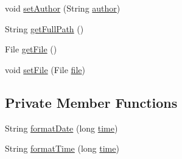\begin{DoxyCompactItemize}
\item 
void \hyperlink{classorg_1_1buildmlearn_1_1toolkit_1_1model_1_1SavedProject_a59a14f4cc86c7079a84c591177418e61}{set\+Author} (String \hyperlink{classorg_1_1buildmlearn_1_1toolkit_1_1model_1_1SavedProject_a906f1314db905654413dcbd90f25658b}{author})
\item 
String \hyperlink{classorg_1_1buildmlearn_1_1toolkit_1_1model_1_1SavedProject_af5b8dd7b1537d22874905c305fa3698a}{get\+Full\+Path} ()
\item 
File \hyperlink{classorg_1_1buildmlearn_1_1toolkit_1_1model_1_1SavedProject_abb1361575d53240244c368ab3b18ffb8}{get\+File} ()
\item 
void \hyperlink{classorg_1_1buildmlearn_1_1toolkit_1_1model_1_1SavedProject_a38b605c92572817f27a18173277c253d}{set\+File} (File \hyperlink{classorg_1_1buildmlearn_1_1toolkit_1_1model_1_1SavedProject_aecf6d31347ba21b07d34025fb55259c1}{file})
\end{DoxyCompactItemize}
\subsection*{Private Member Functions}
\begin{DoxyCompactItemize}
\item 
String \hyperlink{classorg_1_1buildmlearn_1_1toolkit_1_1model_1_1SavedProject_af17ac41e8a0b7357f11fc1cb0bb112aa}{format\+Date} (long \hyperlink{classorg_1_1buildmlearn_1_1toolkit_1_1model_1_1SavedProject_a2ee63cfcb4cedf66e5d46fd02632d88b}{time})
\item 
String \hyperlink{classorg_1_1buildmlearn_1_1toolkit_1_1model_1_1SavedProject_a6bc3986d70d7dba3afd39b738c627e39}{format\+Time} (long \hyperlink{classorg_1_1buildmlearn_1_1toolkit_1_1model_1_1SavedProject_a2ee63cfcb4cedf66e5d46fd02632d88b}{time})
\end{DoxyCompactItemize}
